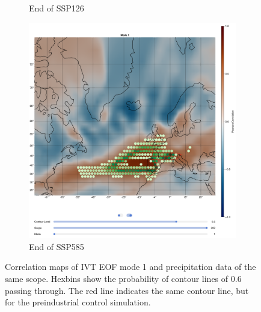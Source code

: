 \begin{figure}[!htb]
\begin{subfigure}[b]{0.32\textwidth}
    \caption{End of SSP126} 
    \label{fig:ivt eof pr cor ssp126 mode1}
  \end{subfigure}
  \begin{subfigure}[b]{0.32\textwidth}
    \includegraphics[width=\textwidth]{figures/ivt_pr_cor_mode1_ssp585_hexbin.png}
    \caption{End of SSP585}
    \label{fig:ivt eof pr cor ssp585 mode1}
  \end{subfigure}
  \caption{Correlation maps of IVT EOF mode 1 and precipitation data of the same scope. Hexbins show the probability of contour lines of $0.6$ passing through. The red line indicates the same contour line, but for the preindustrial control simulation.}
  \label{fig:ivt eof pr cor mode1}
\end{figure}


